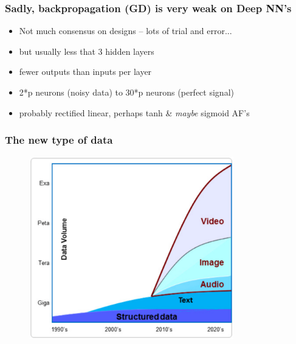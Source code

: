 \documentclass[xcolor={dvipsnames}]{beamer}
\begin{document}
\frame
{
 \frametitle{Sadly, backpropagation (GD) is very weak on Deep NN's}

\begin{itemize} 
\item Not much consensus on designs -- lots of trial and error...
\item<2-> but usually less that 3 hidden layers
\item<3-> fewer outputs than inputs per layer
\item<4-> 2*p neurons (noisy data) to 30*p neurons (perfect signal)
\item<5-> probably rectified linear, perhaps tanh \& \emph{maybe} sigmoid AF's
\end{itemize}


}


\frame
{
 \frametitle{The new type of data}

\begin{figure}
\centering
\includegraphics[width=3.5in]{stuff/image_motive.png}
\end{figure}

}
\end{document}
